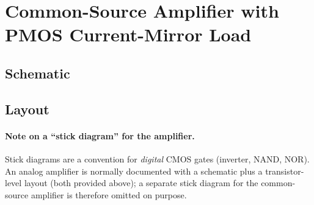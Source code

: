 \documentclass[11pt]{article}
\begin{document}
\clearpage
\section{Common-Source Amplifier with PMOS Current-Mirror Load}
\subsection*{Schematic}
\begin{center}\end{center}
\subsection*{Layout}
\begin{center}\end{center}

\paragraph{Note on a ``stick diagram'' for the amplifier.}
Stick diagrams are a convention for \emph{digital} CMOS gates (inverter, NAND, NOR).
An analog amplifier is normally documented with a schematic plus a transistor-level
layout (both provided above); a separate stick diagram for the common-source amplifier
is therefore omitted on purpose.
\end{document}
